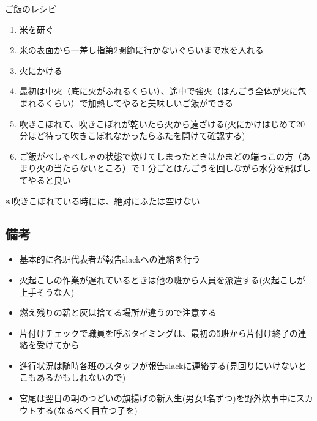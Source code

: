 \begin{itembox}[l]{ご飯のレシピ}
  \begin{enumerate}
    \item 米を研ぐ
    \item 米の表面から一差し指第2関節に行かないぐらいまで水を入れる
    \item 火にかける

    \item 最初は中火（底に火がふれるくらい）、途中で強火（はんごう全体が火に包まれるくらい）で加熱してやると美味しいご飯ができる
    \item 吹きこぼれて、吹きこぼれが乾いたら火から遠ざける(火にかけはじめて20分ほど待って吹きこぼれなかったらふたを開けて確認する)
    \item ご飯がべしゃべしゃの状態で炊けてしまったときはかまどの端っこの方（あまり火の当たらないところ）で１分ごとはんごうを回しながら水分を飛ばしてやると良い
  \end{enumerate}
※吹きこぼれている時には、絶対にふたは空けない
\end{itembox}


\subsection{備考}
\begin{itemize}
\item 基本的に各班代表者が報告slackへの連絡を行う
\item 火起こしの作業が遅れているときは他の班から人員を派遣する(火起こしが上手そうな人)
\item 燃え残りの薪と灰は捨てる場所が違うので注意する
\item 片付けチェックで職員を呼ぶタイミングは、最初の5班から片付け終了の連絡を受けてから
\item 進行状況は随時各班のスタッフが報告slackに連絡する(見回りにいけないとこもあるかもしれないので)
\item 宮尾は翌日の朝のつどいの旗揚げの新入生(男女1名ずつ)を野外炊事中にスカウトする(なるべく目立つ子を)
\end{itemize}


%
